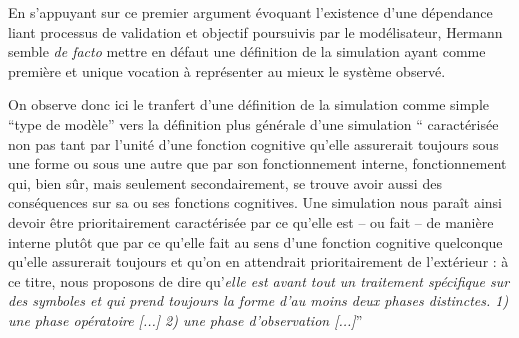


En s'appuyant sur ce premier argument évoquant l'existence d'une dépendance liant processus de validation et objectif poursuivis par le modélisateur, Hermann semble \textit{de facto} mettre en défaut une définition de la simulation ayant comme première et unique vocation à représenter au mieux le système observé.

On observe donc ici le tranfert d'une définition de la simulation comme simple \enquote{type de modèle} vers la définition plus générale d'une simulation \enquote{ caractérisée non pas tant par l’unité d’une fonction cognitive qu’elle assurerait toujours sous une forme ou sous une autre que par son fonctionnement interne, fonctionnement qui, bien sûr, mais seulement secondairement, se trouve avoir aussi des conséquences sur sa ou ses fonctions cognitives. Une simulation nous paraît ainsi devoir être prioritairement caractérisée par ce qu’elle est – ou fait – de manière interne plutôt que par ce qu’elle fait au sens d’une fonction cognitive quelconque qu’elle assurerait toujours et qu’on en attendrait prioritairement de l’extérieur : à ce titre, nous proposons de dire qu’\textit{elle est avant tout un traitement spécifique sur des symboles et qui prend toujours la forme d'au moins deux phases distinctes. 1) une phase opératoire [...] 2) une phase d'observation [...]}} \autocite[33-34]{Varenne2013}

